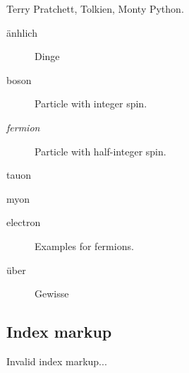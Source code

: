 \documentclass[letterpaper,10pt,english]{sphinxhowto}
\begin{document}
Terry Pratchett, Tolkien, Monty Python.

\begin{description}
\item[{änhlich}] \leavevmode{}\label{markup:term-anhlich}
Dinge

\item[{boson}] \leavevmode{}\label{markup:term-boson}
Particle with integer spin.

\item[{\emph{fermion}}] \leavevmode{}\label{markup:term-fermion}
Particle with half-integer spin.

\item[{tauon}] \leavevmode{}\label{markup:term-tauon}\item[{myon}] \leavevmode{}\label{markup:term-myon}\item[{electron}] \leavevmode{}\label{markup:term-electron}
Examples for fermions.

\item[{über}] \leavevmode{}\label{markup:term-uber}
Gewisse

\end{description}


\begin{productionlist}
\label{markup:grammar-token-try_stmt}
\label{markup:grammar-token-try1_stmt}
\label{markup:grammar-token-try2_stmt}
\end{productionlist}



\subsection{Index markup}
\label{markup:index-markup}
Invalid index markup...
\end{document}
